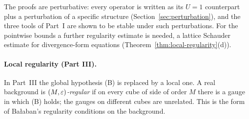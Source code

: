 The proofs are perturbative: every operator is written as its $U=1$ counterpart plus a perturbation of a specific structure (Section~\ref{sec:perturbation}), and the three tools of Part~I are shown to be stable under such perturbations. For the pointwise bounds a further regularity estimate is needed, a lattice Schauder estimate for divergence-form equations (Theorem~\ref{thm:local-regularity}(d)).

\paragraph{Local regularity (Part III).} In Part~III the global hypothesis (B) is replaced by a local one. A real background is \emph{$(M,\varepsilon)$-regular} if on every cube of side of order $M$ there is a gauge in which (B) holds; the gauges on different cubes are unrelated. This is the form of Ba\l aban's regularity conditions on the background.

